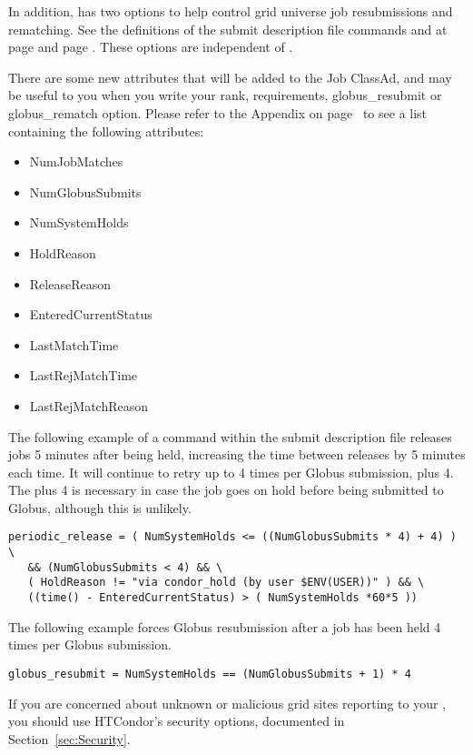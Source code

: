 In addition,  has two options to help control
grid universe job resubmissions and rematching.  
See the definitions of the submit description file commands
 and  at 
page \pageref{condor-submit-globus-rematch} and
page \pageref{condor-submit-globus-resubmit}.
These options are independent of .

There are some new attributes that will be added to the Job ClassAd,
and may be useful to you when you write your rank, requirements,
globus\_resubmit or globus\_rematch option. Please refer to
the Appendix on page~\pageref{sec:Job-ClassAd-Attributes} 
to see a list containing the following attributes:

\begin{itemize}
\item NumJobMatches
\item NumGlobusSubmits
\item NumSystemHolds
\item HoldReason
\item ReleaseReason
\item EnteredCurrentStatus
\item LastMatchTime
\item LastRejMatchTime
\item LastRejMatchReason
\end{itemize}

The following example of a command within the submit description file
releases jobs 5 minutes after being held,
increasing the time between releases by 5 minutes each time.
It will continue to retry up to 4 times per Globus
submission, plus 4.
The plus 4 is necessary in case
the job goes on hold before being submitted to Globus, although
this is unlikely.

\footnotesize
\begin{verbatim}
periodic_release = ( NumSystemHolds <= ((NumGlobusSubmits * 4) + 4) ) \
   && (NumGlobusSubmits < 4) && \
   ( HoldReason != "via condor_hold (by user $ENV(USER))" ) && \
   ((time() - EnteredCurrentStatus) > ( NumSystemHolds *60*5 ))
\end{verbatim}
\normalsize

The following example forces Globus resubmission after a job has
been held 4 times per Globus submission.

\footnotesize
\begin{verbatim}
globus_resubmit = NumSystemHolds == (NumGlobusSubmits + 1) * 4
\end{verbatim}
\normalsize

If you are concerned about unknown or malicious grid sites reporting
to your , you should use HTCondor's security options,
documented in Section~\ref{sec:Security}.
